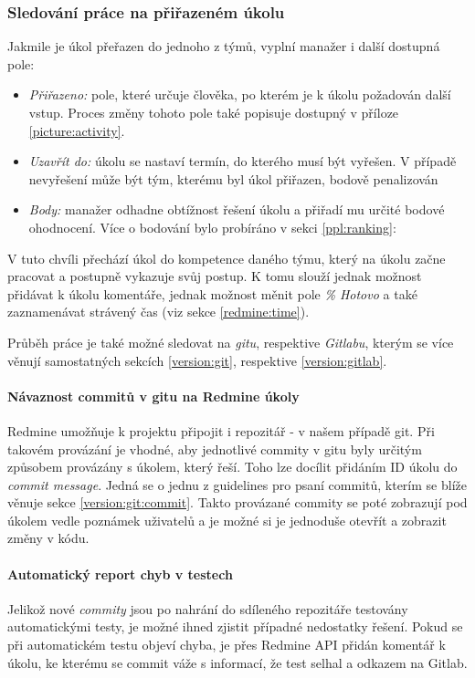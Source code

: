 \subsubsection{Sledování práce na přiřazeném úkolu}

Jakmile je úkol přeřazen do jednoho z týmů, vyplní manažer i další dostupná pole:
\begin{itemize}
	\item \emph{Přiřazeno:} pole, které určuje člověka, po kterém je k úkolu požadován další vstup. Proces změny tohoto pole také popisuje  dostupný v příloze \ref{picture:activity}.
	\item \emph{Uzavřít do:} úkolu se nastaví termín, do kterého musí být vyřešen. V případě nevyřešení může být tým, kterému byl úkol přiřazen, bodově penalizován
	\item \emph{Body:} manažer odhadne obtížnost řešení úkolu a přiřadí mu určité bodové ohodnocení. Více o bodování bylo probíráno v sekci \ref{ppl:ranking}: 
\end{itemize}

V tuto chvíli přechází úkol do kompetence daného týmu, který na úkolu začne pracovat a postupně vykazuje svůj postup. K tomu slouží jednak možnost přidávat k úkolu komentáře, jednak možnost měnit pole \emph{\% Hotovo} a také zaznamenávat strávený čas (viz sekce \ref{redmine:time}).

Průběh práce je také možné sledovat na \emph{gitu}, respektive \emph{Gitlabu}, kterým se více věnují samostatných sekcích \ref{version:git}, respektive \ref{version:gitlab}.

\paragraph{Návaznost commitů v gitu na Redmine úkoly} \label{redmine:commitlink}
Redmine umožňuje k projektu připojit i repozitář - v našem případě git. Při takovém provázání je vhodné, aby jednotlivé commity v gitu byly určitým způsobem provázány s úkolem, který řeší. Toho lze docílit přidáním ID úkolu do \emph{commit message}. Jedná se o jednu z guidelines pro psaní commitů, kterím se blíže věnuje sekce \ref{version:git:commit}. Takto provázané commity se poté zobrazují pod úkolem vedle poznámek uživatelů a je možné si je jednoduše otevřít a zobrazit změny v kódu.

\paragraph{Automatický report chyb v testech} \label{redmine:CI_report}
Jelikož nové \emph{commity} jsou po nahrání do sdíleného repozitáře testovány automatickými testy, je možné ihned zjistit případné nedostatky řešení. Pokud se při automatickém testu objeví chyba, je přes Redmine API přidán komentář k úkolu, ke kterému se commit váže s informací, že test selhal a odkazem na Gitlab.

